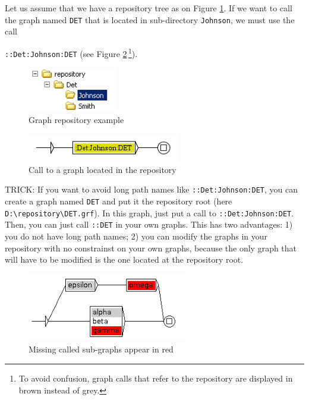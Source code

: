 
\bigskip
\noindent Let us assume that we have a repository tree as on Figure
\ref{repository}. If we want to call the graph named \verb+DET+ that is located
in sub-directory \verb+Johnson+, we must use the call

\noindent \verb+::Det:Johnson:DET+
(see Figure \ref{repository-graph-call}\,\footnote{To avoid confusion, graph calls
that refer to the repository are displayed in brown instead of grey.}).


\bigskip
\begin{figure}[!h]
\begin{center}
\includegraphics[width=3.9cm]{resources/img/fig5-11.png}
\caption{Graph repository example\label{repository}}
\end{center}
\end{figure}

\begin{figure}[!h]
\begin{center}
\includegraphics[width=6.7cm]{resources/img/fig5-12.png}
\caption{Call to a graph located in the
repository\label{repository-graph-call}}
\end{center}
\end{figure}


\bigskip
\noindent TRICK: If you want to avoid long path names like
\verb+::Det:Johnson:DET+, you can create a graph named \verb+DET+ and put it the
repository root (here \verb+D:\repository\DET.grf+). In this graph, just put a
call to \verb+::Det:Johnson:DET+. Then, you can just call \verb+::DET+ in your
own graphs. This has two advantages: 1) you do not have long path names; 2) you
can modify the graphs in your repository with no constrainst on your own graphs,
because the only graph that will have to be modified is the one located at the
repository root.

\begin{figure}[h!]
\begin{center}
\includegraphics[width=7cm]{resources/img/fig5-9.png}
\caption{Missing called sub-graphs appear in red}
\end{center}
\end{figure}


